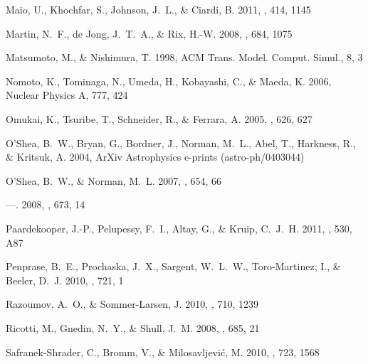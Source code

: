\documentclass[12pt,preprint]{aastex}
\begin{document}
\begin{thebibliography}{108}
{Maio}, U., {Khochfar}, S., {Johnson}, J.~L., \& {Ciardi}, B. 2011, \mnras,
  414, 1145

{Martin}, N.~F., {de Jong}, J.~T.~A., \& {Rix}, H.-W. 2008, \apj, 684, 1075

Matsumoto, M., \& Nishimura, T. 1998, ACM Trans. Model. Comput. Simul., 8, 3

{Nomoto}, K., {Tominaga}, N., {Umeda}, H., {Kobayashi}, C., \& {Maeda}, K.
  2006, Nuclear Physics A, 777, 424

{Omukai}, K., {Tsuribe}, T., {Schneider}, R., \& {Ferrara}, A. 2005, \apj, 626,
  627

{O'Shea}, B.~W., {Bryan}, G., {Bordner}, J., {Norman}, M.~L., {Abel}, T.,
  {Harkness}, R., \& {Kritsuk}, A. 2004, ArXiv Astrophysics e-prints
  (astro-ph/0403044)

{O'Shea}, B.~W., \& {Norman}, M.~L. 2007, \apj, 654, 66

---. 2008, \apj, 673, 14

{Paardekooper}, J.-P., {Pelupessy}, F.~I., {Altay}, G., \& {Kruip}, C.~J.~H.
  2011, \aap, 530, A87

{Penprase}, B.~E., {Prochaska}, J.~X., {Sargent}, W.~L.~W., {Toro-Martinez},
  I., \& {Beeler}, D.~J. 2010, \apj, 721, 1

{Razoumov}, A.~O., \& {Sommer-Larsen}, J. 2010, \apj, 710, 1239

{Ricotti}, M., {Gnedin}, N.~Y., \& {Shull}, J.~M. 2008, \apj, 685, 21

{Safranek-Shrader}, C., {Bromm}, V., \& {Milosavljevi{\'c}}, M. 2010, \apj,
  723, 1568


\end{thebibliography}
\end{document}
